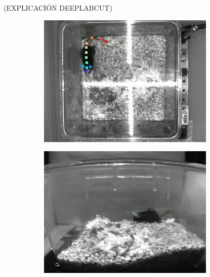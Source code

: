 (EXPLICACIÓN DEEPLABCUT)

\begin{figure}[]
  \centering
  \begin{subfigure}{0.45\textwidth}
    \centering
    \includegraphics[width=\textwidth, angle=-90]{figures/deeplabcut-top-example-4128-2020-12-02-1-00-37.jpg}
    \caption{}
    \label{fig:deeplabcut-top-example}
  \end{subfigure}
  \begin{subfigure}{0.45\textwidth}
    \centering
    \includegraphics[width=\textwidth]{figures/deeplabcut-lateral-example-4128-2020-12-02-1-00-37.jpg}
    \caption{}
    \label{fig:deeplabcut-lateral-example}
  \end{subfigure}

\end{figure}
